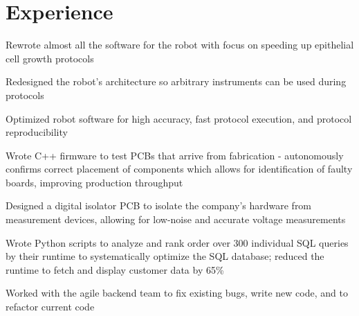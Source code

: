 \documentclass[]{deedy-resume-openfont}
\begin{document}

\section{Experience}

\begin{tightemize}
	\item Rewrote almost all the software for the robot with focus on speeding up epithelial cell growth protocols
	\item Redesigned the robot's architecture so arbitrary instruments can be used during protocols
	\item Optimized robot software for high accuracy, fast protocol execution, and protocol reproducibility
\end{tightemize}

\vspace{8pt}

\begin{tightemize}
    \item Wrote C++ firmware to test PCBs that arrive from fabrication - autonomously confirms correct placement of components which allows for identification of faulty boards, improving production throughput
    \item Designed a digital isolator PCB to isolate the company's hardware from measurement devices, allowing for low-noise and accurate voltage measurements
\end{tightemize}
\vspace{8pt}

\begin{tightemize}
    \item Wrote Python scripts to analyze and rank order over 300 individual SQL queries by their runtime to systematically optimize the SQL database; reduced the runtime to fetch and display customer data by 65\%
    \item Worked with the agile backend team to fix existing bugs, write new code, and to refactor current code
\end{tightemize}
\vspace{12pt}
\end{document}
